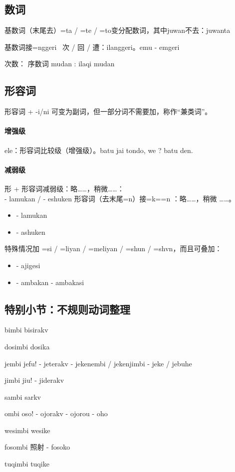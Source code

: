 \subsection{数词}
基数词（末尾去）=ta / =te / =to变分配数词，其中juwan不去：juwanta

基数词接=nggeri ~次 / 回 / 遭：ilanggeri。\irg emu - emgeri

次数： 序数词 mudan : ilaqi mudan

\subsection{形容词}
形容词 + -i/ni 可变为副词，但一部分词不需要加，称作“兼类词”。

\paragraph{增强级}
ele：形容词比较级（增强级）。batu jai tondo, we  ? batu  den.

\paragraph{减弱级}
形 +  形容词减弱级：略……，稍微……：\\
 - lamukan / 
 - eshuken
形容词（去末尾=n）接=k=\AIImedi=n ：略……，稍微 ……。
\begin{itemize}
    \item {} - lamukan
    \item {} - ashuken
\end{itemize}
\irg 特殊情况加 =si / =liyan / =meliyan / =shun / =shvn，而且可叠加：
\begin{itemize}
    \item {} - ajigesi
    \item {} - ambakan - ambakasi
\end{itemize}

\subsection{特别小节：不规则动词整理}

\begin{des}
    \item[bimbi] bisirakv 
    \item[dosimbi] dosika 
    \item[jembi] jefu! - jeterakv - jekenembi / jekenjimbi - jeke / jebuhe
    \item[jimbi] jiu! - jiderakv
    \item[sambi] sarkv 
    \item[ombi] oso! - ojorakv - ojorou - oho
    \item[wesimbi] wesike 
    \item[fosombi]照射 - fosoko
    \item[tuqimbi] tuqike  
\end{des}

